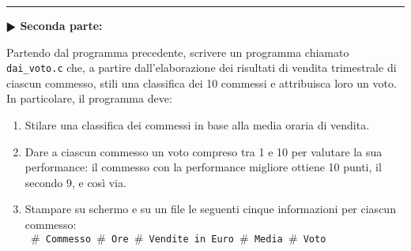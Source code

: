 \documentclass[11pt]{article}
\begin{document}
\hrule
\vspace{2mm}
\textbf{$\RHD$ Seconda parte:}

Partendo dal programma precedente, scrivere un programma chiamato \texttt{dai\_voto.c} che, a partire dall'elaborazione dei risultati di
vendita trimestrale di ciascun commesso, stili una classifica dei 10 commessi e attribuisca loro
un voto. In particolare, il programma deve: 
\begin{enumerate}
\item Stilare una classifica dei commessi in base alla media oraria di vendita.
\item Dare a ciascun commesso un voto compreso tra 1 e 10 per valutare la sua performance: il commesso con la performance migliore ottiene 10 punti, il secondo 9, e così via.
\item Stampare su schermo e su un file le seguenti cinque informazioni per ciascun commesso:\\
\texttt{
$\#$  Commesso $\#$ Ore $\#$ Vendite in Euro $\#$ Media $\#$ Voto\\
}
\end{enumerate}
\end{document}
